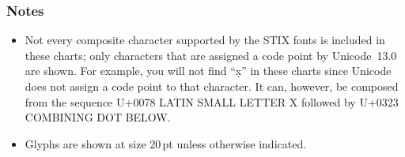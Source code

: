 \subsubsection*{Notes}

\begin{itemize}

\item Not every composite character supported by the STIX fonts is
  included in these charts; only characters that are assigned a code
  point by Unicode~13.0 are shown.  For example, you will not find
  ``x̣'' in these charts since Unicode does not assign a code point to
  that character.  It can, however, be composed from the sequence U+0078
  LATIN SMALL LETTER X followed by U+0323 COMBINING DOT BELOW.


\item Glyphs are shown at size 20\,pt unless otherwise indicated.

\end{itemize}

\endinput
